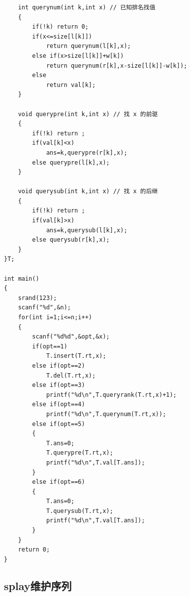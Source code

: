 \documentclass[11pt,a4paper]{ctexart}
\begin{document}
\begin{lstlisting}
	int querynum(int k,int x) // 已知排名找值
	{
		if(!k) return 0;
		if(x<=size[l[k]])
			return querynum(l[k],x);
		else if(x>size[l[k]]+w[k])
			return querynum(r[k],x-size[l[k]]-w[k]);
		else
			return val[k];
	}
	
	void querypre(int k,int x) // 找 x 的前驱 
	{
		if(!k) return ;
		if(val[k]<x)
			ans=k,querypre(r[k],x);
		else querypre(l[k],x);
	}
	
	void querysub(int k,int x) // 找 x 的后继
	{
		if(!k) return ;
		if(val[k]>x)
			ans=k,querysub(l[k],x);
		else querysub(r[k],x);
	}
}T;

int main()
{
	srand(123);
	scanf("%d",&n);
	for(int i=1;i<=n;i++)
	{
		scanf("%d%d",&opt,&x);
		if(opt==1)
			T.insert(T.rt,x);
		else if(opt==2)
			T.del(T.rt,x);
		else if(opt==3)
			printf("%d\n",T.queryrank(T.rt,x)+1);
		else if(opt==4)
			printf("%d\n",T.querynum(T.rt,x));
		else if(opt==5)
		{
			T.ans=0;
			T.querypre(T.rt,x);
			printf("%d\n",T.val[T.ans]);
		}
		else if(opt==6)
		{
			T.ans=0;
			T.querysub(T.rt,x);
			printf("%d\n",T.val[T.ans]);
		}
	}
	return 0;
}
\end{lstlisting}

\subsection{splay维护序列}
\end{document}
